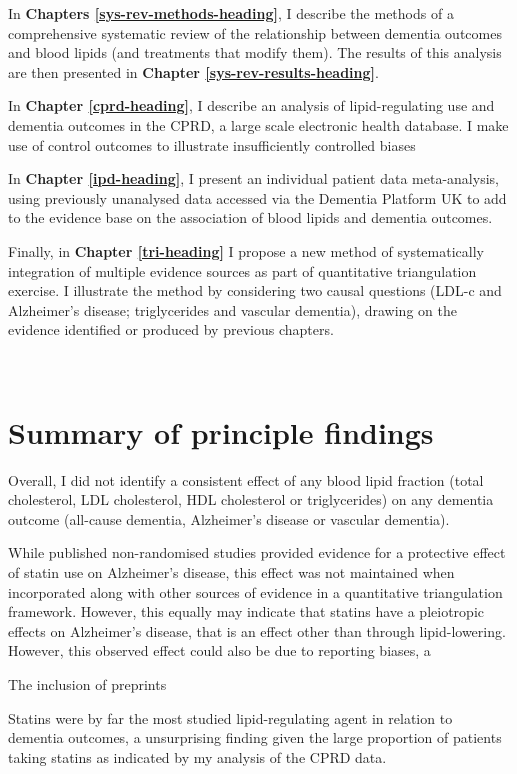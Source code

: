 \documentclass[a4paper, twoside]{templates/ociamthesis}
\begin{document}
In \textbf{Chapters \ref{sys-rev-methods-heading}}, I describe the methods of a comprehensive systematic review of the relationship between dementia outcomes and blood lipids (and treatments that modify them). The results of this analysis are then presented in \textbf{Chapter \ref{sys-rev-results-heading}}.

In \textbf{Chapter \ref{cprd-heading}}, I describe an analysis of lipid-regulating use and dementia outcomes in the CPRD, a large scale electronic health database. I make use of control outcomes to illustrate insufficiently controlled biases

In \textbf{Chapter \ref{ipd-heading}}, I present an individual patient data meta-analysis, using previously unanalysed data accessed via the Dementia Platform UK to add to the evidence base on the association of blood lipids and dementia outcomes.

Finally, in \textbf{Chapter \ref{tri-heading}} I propose a new method of systematically integration of multiple evidence sources as part of quantitative triangulation exercise. I illustrate the method by considering two causal questions (LDL-c and Alzheimer's disease; triglycerides and vascular dementia), drawing on the evidence identified or produced by previous chapters.

~

\hypertarget{summary-of-principle-findings}{%
\section{Summary of principle findings}\label{summary-of-principle-findings}}

Overall, I did not identify a consistent effect of any blood lipid fraction (total cholesterol, LDL cholesterol, HDL cholesterol or triglycerides) on any dementia outcome (all-cause dementia, Alzheimer's disease or vascular dementia).

While published non-randomised studies provided evidence for a protective effect of statin use on Alzheimer's disease, this effect was not maintained when incorporated along with other sources of evidence in a quantitative triangulation framework. However, this equally may indicate that statins have a pleiotropic effects on Alzheimer's disease, that is an effect other than through lipid-lowering. However, this observed effect could also be due to reporting biases, a

The inclusion of preprints

Statins were by far the most studied lipid-regulating agent in relation to dementia outcomes, a unsurprising finding given the large proportion of patients taking statins as indicated by my analysis of the CPRD data.
\end{document}
